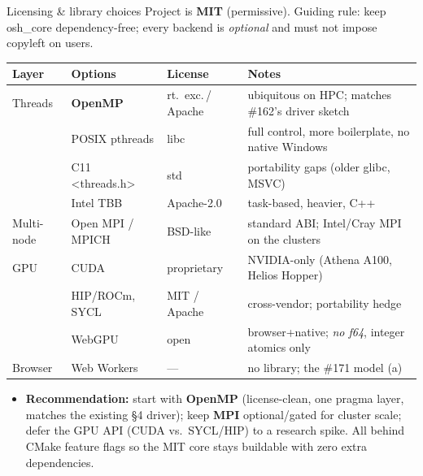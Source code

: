 \documentclass[aspectratio=169,10pt]{beamer}
\newcommand{\code}[1]{{\ttfamily\footnotesize #1}}
\begin{document}
\begin{frame}{Licensing \& library choices}
  \small
  Project is \textbf{MIT} (permissive). Guiding rule: keep \code{osh\_core}
  dependency-free; every backend is \emph{optional} and must not impose
  copyleft on users.
  \vspace{1mm}

  \renewcommand{\arraystretch}{1.2}
  \footnotesize
  \begin{tabular}{l l l p{5.0cm}}
    \textbf{Layer} & \textbf{Options} & \textbf{License} & \textbf{Notes}\\
    \hline
    \textcolor{oshSky}{Threads} & \textbf{OpenMP} & rt.\ exc.\,/\,Apache & ubiquitous on HPC; matches \#162's driver sketch\\
     & POSIX \code{pthreads} & libc & full control, more boilerplate, no native Windows\\
     & C11 \code{<threads.h>} & std & portability gaps (older glibc, MSVC)\\
     & Intel TBB & Apache-2.0 & task-based, heavier, C++\\
    \hline
    \textcolor{oshGreen}{Multi-node} & Open MPI / MPICH & BSD-like & standard ABI; Intel/Cray MPI on the clusters\\
    \hline
    \textcolor{oshRed}{GPU} & CUDA & proprietary & NVIDIA-only (Athena A100, Helios Hopper)\\
     & HIP/ROCm, SYCL & MIT / Apache & cross-vendor; portability hedge\\
     & WebGPU & open & browser+native; \emph{no f64}, integer atomics only\\
    \hline
    \textcolor{oshAmber}{Browser} & Web Workers & --- & no library; the \#171 model (a)\\
  \end{tabular}
  \vspace{1.5mm}

  \begin{itemize}\scriptsize\itemsep1pt
    \item \textbf{Recommendation:} start with \textbf{OpenMP} (license-clean,
          one pragma layer, matches the existing \S4 driver); keep \textbf{MPI}
          optional/gated for cluster scale; defer the GPU API (CUDA vs.\
          SYCL/HIP) to a research spike. All behind CMake feature flags so the
          MIT core stays buildable with zero extra dependencies.
  \end{itemize}
\end{frame}
\end{document}
